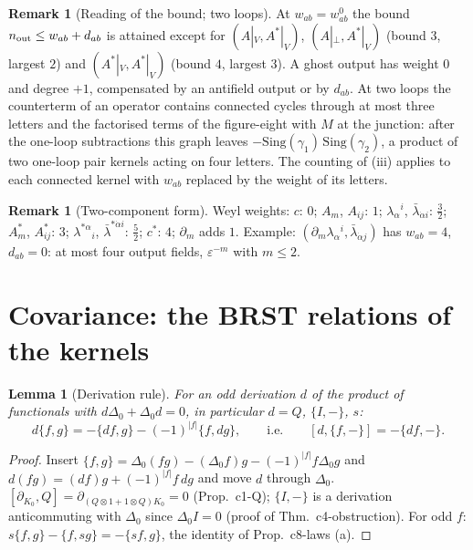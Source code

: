\documentclass[11pt]{article}
\numberwithin{equation}{section}
\theoremstyle{plain}
\newtheorem{lemma}[theorem]{Lemma}
\theoremstyle{definition}
\newtheorem{remark}[theorem]{Remark}
\begin{document}
\begin{remark}[Reading of the bound; two loops]
\label{rem:tl-boundread}
At $w_{ab}=w^0_{ab}$ the bound $n_{\rm out}\le w_{ab}+d_{ab}$ is attained except for $(A|_V,A^*|_V)$, $(A|_\perp,A^*|_V)$ (bound $3$, largest $2$) and $(A^*|_V,A^*|_V)$ (bound $4$, largest $3$). A ghost output has weight $0$ and degree $+1$, compensated by an antifield output or by $d_{ab}$. At two loops the counterterm of an operator contains connected cycles through at most three letters and the factorised terms of the figure-eight with $M$ at the junction: after the one-loop subtractions this graph leaves $-\mathrm{Sing}(\gamma_1)\,\mathrm{Sing}(\gamma_2)$, a product of two one-loop pair kernels acting on four letters. The counting of (iii) applies to each connected kernel with $w_{ab}$ replaced by the weight of its letters.
\end{remark}

\begin{remark}[Two-component form]
Weyl weights: $c$: $0$; $A_m$, $A_{ij}$: $1$; $\lambda_\alpha{}^i$, $\bar\lambda_{\dot\alpha i}$: $\tfrac32$; $A^*_m$, $A^*_{ij}$: $3$; $\lambda^{*\alpha}{}_i$, $\bar\lambda^{*\dot\alpha i}$: $\tfrac52$; $c^*$: $4$; $\partial_m$ adds $1$. Example: $(\partial_m\lambda_\alpha{}^i,\bar\lambda_{\dot\alpha j})$ has $w_{ab}=4$, $d_{ab}=0$: at most four output fields, $\varepsilon^{-m}$ with $m\le2$.
\end{remark}

\section{Covariance: the BRST relations of the kernels}
\label{sec:tl-cov}

\begin{lemma}[Derivation rule]
\label{lem:tl-deriv}
For an odd derivation $d$ of the product of functionals with $d\Delta_0+\Delta_0d=0$, in particular $d=Q$, $\{I,-\}$, $s$:
\[
d\{f,g\}=-\{df,g\}-(-1)^{|f|}\{f,dg\},\qquad\text{i.e.}\qquad [d,\{f,-\}]=-\{df,-\}.
\]
\end{lemma}

\begin{proof}
Insert $\{f,g\}=\Delta_0(fg)-(\Delta_0f)g-(-1)^{|f|}f\Delta_0g$ and $d(fg)=(df)g+(-1)^{|f|}f\,dg$ and move $d$ through $\Delta_0$. $[\partial_{K_0},Q]=\partial_{(Q\otimes1+1\otimes Q)K_0}=0$ (Prop.~c1-Q); $\{I,-\}$ is a derivation anticommuting with $\Delta_0$ since $\Delta_0I=0$ (proof of Thm.~c4-obstruction). For odd $f$: $s\{f,g\}-\{f,sg\}=-\{sf,g\}$, the identity of Prop.~c8-laws (a).
\end{proof}
\end{document}
